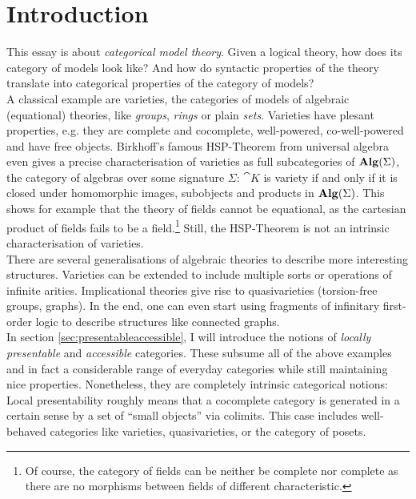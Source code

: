 \section*{Introduction}
{}

This essay is about \emph{categorical model theory}. Given a logical theory, how does its category of models look like? And how do syntactic properties of the theory translate into categorical properties of the category of models? \\

A classical example are varieties, the categories of models of algebraic (equational) theories, like \emph{groups}, \emph{rings} or plain \emph{sets}. Varieties have plesant properties, e.g. they are complete and cocomplete, well-powered, co-well-powered and have free objects. Birkhoff's famous HSP-Theorem from universal algebra even gives a precise characterisation of varieties as full subcategories of $\mathbf{Alg}(\Sigma)$, the category of algebras over some signature $\Sigma$: $\cat K$ is variety if and only if it is closed under homomorphic images, subobjects and products in $\mathbf{Alg}(\Sigma)$. 
This shows for example that the theory of fields cannot be equational, as the cartesian product of fields fails to be a field.\footnote{Of course, the category of fields can be neither be complete nor complete as there are no morphisms between fields of different characteristic.}
Still, the HSP-Theorem is not an intrinsic characterisation of varieties. \\

There are several generalisations of algebraic theories to describe more interesting structures. Varieties can be extended to include multiple sorts or operations of infinite arities. Implicational theories give rise to quasivarieties (torsion-free groups, graphs). In the end, one can even start using fragments of infinitary first-order logic to describe structures like connected graphs. \\

In section \ref{sec:presentableaccessible}, I will introduce the notions of \emph{locally presentable} and \emph{accessible} categories. These subsume all of the above examples and in fact a considerable range of everyday categories while still maintaining nice properties. Nonetheless, they are completely intrinsic categorical notions: Local presentability roughly means that a cocomplete category is generated in a certain sense by a set of ``small objects'' via colimits. This case includes well-behaved categories like varieties, quasivarieties, or the category of posets. \\

